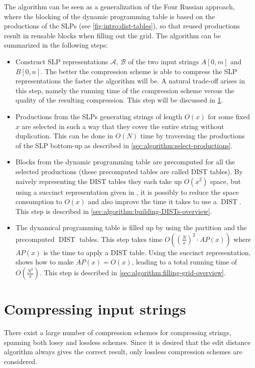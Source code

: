 \documentclass[twoside,11pt,openright]{report}
\newcommand{\DIST}{\operatorname{DIST}}
\newcommand{\str}[3]{#1[#2, #3]}
\newcommand{\SLP}[1] {\mathcal{#1}}
\begin{document}
The algorithm can be seen as a generalization of the Four Russian approach, where the blocking of the dynamic programming table is based on the productions of the SLPs (see \cref{fig:intro:dist-tables}), so that reused productions result in reusable blocks when filling out the grid. The algorithm can be summarized in the following steps:
\begin{itemize}
  \item Construct SLP representations $\SLP{A}$, $\SLP{B}$ of the two input strings $\str{A}{0}{m}$ and $\str{B}{0}{n}$. The better the compression scheme is able to compress the SLP representations the faster the algorithm will be. A natural trade-off arises in this step, namely the running time of the compression scheme versus the quality of the resulting compression. This step will be discussed in \cref{ch:compressing-strings}.
  \item Productions from the SLPs generating strings of length $O(x)$ for some fixed $x$ are selected in such a way that they cover the entire string without duplication. This can be done in $O(N)$ time by traversing the productions of the SLP bottom-up as described in \cref{sec:algorithm:select-productions}.
  \item Blocks from the dynamic programming table are precomputed for all the selected productions (these precomputed tables are called DIST tables). By naively representing the DIST tables they each take up $O(x^2)$ space, but using a succinct representation given in \cite{DBLP:journals/corr/abs-0707-3619}, it is possibly to reduce the space consumption to $O(x)$ and also improve the time it takes to use a $\DIST$. This step is described in \cref{sec:algorithm:building-DISTs-overview}.
  \item The dynamical programming table is filled up by using the partition and the precomputed $\DIST$ tables. This step takes time $O\left(\left(\frac{N}{x}\right)^2 \cdot AP(x)\right)$ where $AP(x)$ is the time to apply a DIST table. Using the succinct representation, \cite{Gawrychowski:2012:FAC:2422024.2422048} shows how to make $AP(x) = O(x)$, leading to a total running time of $O(\frac{N^2}{x})$. This step is described in \cref{sec:algorithm:filling-grid-overview}.
\end{itemize}

\chapter{Compressing input strings}
\label{ch:compressing-strings}
There exist a large number of compression schemes for compressing strings, spanning both lossy and lossless schemes. Since it is desired that the edit distance algorithm always gives the correct result, only lossless compression schemes are considered.
\end{document}
